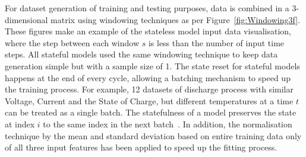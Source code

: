 %
%
For dataset generation of training and testing purposes, data is combined in a 3-dimensional matrix using windowing techniques as per \mbox{Figure~\ref{fig:Windowing3f}}.
These figures make an example of the stateless model input data visualisation, where the step between each window $s$ is less than the number of input time steps.
All stateful models used the same windowing technique to keep data generation simple but with a sample size of 1.
The state reset for stateful models happens at the end of every cycle, allowing a batching mechanism to speed up the training process.
For example, 12 datasets of discharge process with similar Voltage, Current and the State of Charge, but different temperatures at a time $t$ can be treated as a single batch.
The statefulness of a model preserves the state at index $i$ to the same index in the next batch~\cite{zhu_statefulnes_tfdocs_2020}.
In addition, the normalisation technique by the mean and standard deviation based on entire training data only of all three input features has been applied to speed up the fitting process.

